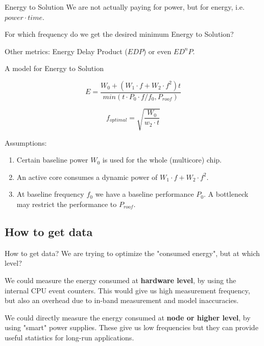 \documentclass[10pt, compress]{beamer}
\begin{document}
\begin{frame}[fragile]{Energy to Solution}
 We are not actually paying for power, but for energy, i.e. $power \cdot time$.
 
 For which frequency do we get the desired \alert{minimum Energy to Solution}?
 
 Other metrics: Energy Delay Product ($EDP$) or even $ED^nP$. 
\end{frame}

\begin{frame}[fragile]{A model for Energy to Solution}

\begin{equation}
E = \frac{W_0 + (W_1 \cdot f + W_2 \cdot f^2 ) t}{min(t \cdot P_0 \cdot f / f_0 , P_{roof})}
\end{equation}

\begin{equation}
f_{optimal} = \sqrt{\frac{W_0}{w_2 \cdot t}}
\end{equation}

Assumptions:
\begin{enumerate}
\item Certain baseline power $W_0$ is used for the whole (multicore) chip.
\item An active core consumes a dynamic power of $W_1 \cdot f + W_2 \cdot f^2$.
\item At baseline frequency $f_0$ we have a baseline performance $P_0$. A bottleneck
may restrict the performance to $P_{roof}$.
\end{enumerate}
\end{frame}


\subsection{How to get data}
\begin{frame}[fragile]{How to get data?}
We are trying to optimize the "consumed energy", but at which level?

We could measure the energy consumed at \textbf{hardware level}, by using
the internal CPU event counters. This would give us high measurement frequency,
but also an overhead due to in-band measurement and model inaccuracies.

We could directly measure the energy consumed at \textbf{node or higher level}, by using "smart" power supplies. These give us low frequencies but they can provide useful statistics for long-run applications.
\end{frame}
\end{document}
